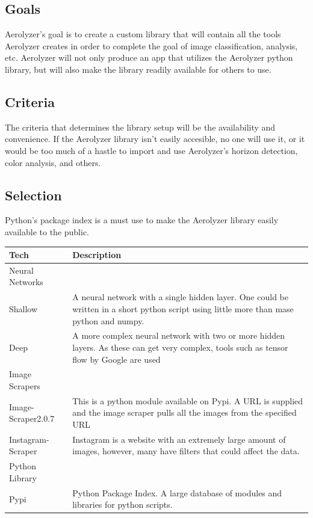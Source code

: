 \documentclass[onecolumn, draftclsnofoot,10pt, compsoc]{IEEEtran}
\begin{document}
\begin{singlespace}
\subsection{Goals}
Aerolyzer's goal is to create a custom library that will contain all the tools Aerolyzer creates in order to complete the goal of image classification, analysis, etc. Aerolyzer will not only produce an app that utilizes the Aerolyzer python library, but will also make the library readily available for others to use.

\subsection{Criteria}
The criteria that determines the library setup will be the availability and convenience. If the Aerolyzer library isn't easily accesible, no one will use it, or it would be too much of a hastle to import and use Aerolyzer's horizon detection, color analysis, and others.
\subsection{Selection}
Python's package index is a must use to make the Aerolyzer library easily available to the public. 


\begin{table}[h!]
\centering
 \begin{tabular}{||p{6cm}  p{11cm}||} 
 \hline
 Tech & Description\\ [0.5ex] 
 \hline\hline
 Neural Networks&\\
 \hline
 Shallow & A neural network with a single hidden layer. One could be written in a short python script using little more than mase python and numpy.\\
 
 Deep & A more complex neural network with two or more hidden layers. As these can get very complex, tools such as tensor flow by Google are used\\
 \hline
 Image Scrapers&\\
 \hline
 Image-Scraper2.0.7 & This is a python module available on Pypi. A URL is supplied and the image scraper pulls all the images from the specified URL \\
 Instagram-Scraper & Instagram is a website with an extremely large amount of images, however, many have filters that could affect the data. \\
 \hline
 Python Library&\\
 \hline
 Pypi & Python Package Index. A large database of modules and libraries for python scripts.  \\ [1ex] 
 \hline
 \end{tabular}
\end{table}

	\nocite{*}
	
	

\end{singlespace}
\end{document}
